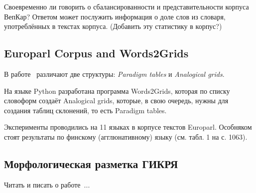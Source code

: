 \bigskip

Своевременно ли говорить о сбалансированности и представительности корпуса ВепКар? 
Ответом может послужить информация о доле слов из словаря, употреблённых в текстах корпуса. 
(Добавить эту статистику в корпус?)



\subsection{Europarl Corpus and Words2Grids}

В работе~\cite{Fam2018tools} различают две структуры: \emph{Paradigm tables} 
и \emph{Analogical grids}. 

На языке Python разработана программа Words2Grids, которая по списку словоформ 
создаёт Analogical grids, которые, в свою очередь, нужны для создания 
таблиц склонений, то есть Paradigm tables.

Эксперименты проводились на 11 языках в корпусе текстов Europarl. 
Особняком стоят результаты по финскому (агглюнативному) языку (см. табл. 1 на с. 1063).


\subsection{Морфологическая разметка ГИКРЯ}

Читать и писать о работе~\cite{Selegey2016}...
